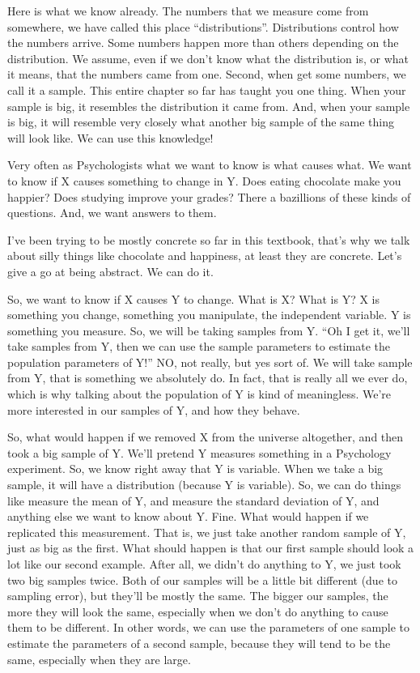 \documentclass[
]{book}
\begin{document}
Here is what we know already. The numbers that we measure come from somewhere, we have called this place ``distributions''. Distributions control how the numbers arrive. Some numbers happen more than others depending on the distribution. We assume, even if we don't know what the distribution is, or what it means, that the numbers came from one. Second, when get some numbers, we call it a sample. This entire chapter so far has taught you one thing. When your sample is big, it resembles the distribution it came from. And, when your sample is big, it will resemble very closely what another big sample of the same thing will look like. We can use this knowledge!

Very often as Psychologists what we want to know is what causes what. We want to know if X causes something to change in Y. Does eating chocolate make you happier? Does studying improve your grades? There a bazillions of these kinds of questions. And, we want answers to them.

I've been trying to be mostly concrete so far in this textbook, that's why we talk about silly things like chocolate and happiness, at least they are concrete. Let's give a go at being abstract. We can do it.

So, we want to know if X causes Y to change. What is X? What is Y? X is something you change, something you manipulate, the independent variable. Y is something you measure. So, we will be taking samples from Y. ``Oh I get it, we'll take samples from Y, then we can use the sample parameters to estimate the population parameters of Y!'' NO, not really, but yes sort of. We will take sample from Y, that is something we absolutely do. In fact, that is really all we ever do, which is why talking about the population of Y is kind of meaningless. We're more interested in our samples of Y, and how they behave.

So, what would happen if we removed X from the universe altogether, and then took a big sample of Y. We'll pretend Y measures something in a Psychology experiment. So, we know right away that Y is variable. When we take a big sample, it will have a distribution (because Y is variable). So, we can do things like measure the mean of Y, and measure the standard deviation of Y, and anything else we want to know about Y. Fine. What would happen if we replicated this measurement. That is, we just take another random sample of Y, just as big as the first. What should happen is that our first sample should look a lot like our second example. After all, we didn't do anything to Y, we just took two big samples twice. Both of our samples will be a little bit different (due to sampling error), but they'll be mostly the same. The bigger our samples, the more they will look the same, especially when we don't do anything to cause them to be different. In other words, we can use the parameters of one sample to estimate the parameters of a second sample, because they will tend to be the same, especially when they are large.
\end{document}
